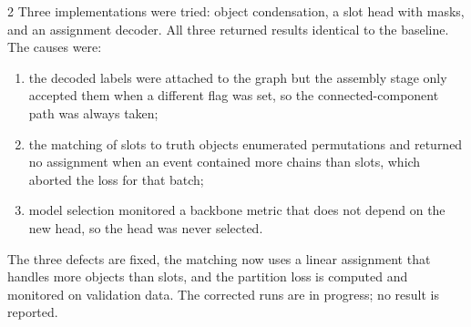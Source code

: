 \documentclass[10pt]{article}
\begin{document}
\begin{multicols}{2}
Three implementations were tried: object condensation, a slot head with masks, and an assignment decoder. All three returned results identical to the baseline. The causes were:
\begin{enumerate}
\item the decoded labels were attached to the graph but the assembly stage only accepted them when a different flag was set, so the connected-component path was always taken;
\item the matching of slots to truth objects enumerated permutations and returned no assignment when an event contained more chains than slots, which aborted the loss for that batch;
\item model selection monitored a backbone metric that does not depend on the new head, so the head was never selected.
\end{enumerate}
The three defects are fixed, the matching now uses a linear assignment that handles more objects than slots, and the partition loss is computed and monitored on validation data. The corrected runs are in progress; no result is reported.

\end{multicols}
\end{document}
